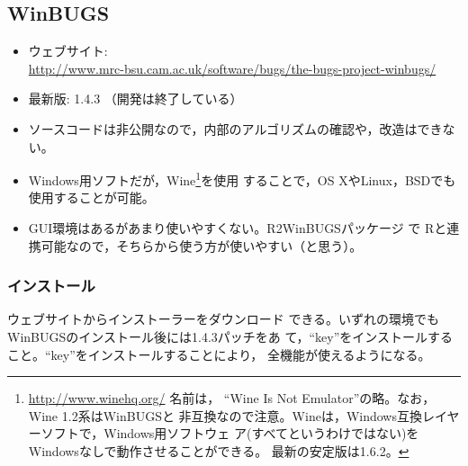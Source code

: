 \documentclass[11pt,uplatex]{jsarticle}
\begin{document}


\subsection{WinBUGS}

\begin{itemize}

\item ウェブサイト:\\
  \url{http://www.mrc-bsu.cam.ac.uk/software/bugs/the-bugs-project-winbugs/}
\item 最新版: 1.4.3 （開発は終了している）
\item ソースコードは非公開なので，内部のアルゴリズムの確認や，改造はできない。
\item Windows用ソフトだが，\textsf{Wine}\footnote{\url{http://www.winehq.org/} 名前は，
``Wine Is Not Emulator''の略。なお，\textsf{Wine} 1.2系は\textsf{WinBUGS}と
  非互換なので注意。\textsf{Wine}は，Windows互換レイヤーソフトで，Windows用ソフトウェ
  ア(すべてというわけではない)をWindowsなしで動作させることができる。
  最新の安定版は1.6.2。}を使用
  することで，OS XやLinux，BSDでも使用することが可能。
\item GUI環境はあるがあまり使いやすくない。\textsf{R2WinBUGS}パッケージ
  で \textsf{R}と連携可能なので，そちらから使う方が使いやすい（と思う）。
\end{itemize}

\subsubsection*{インストール}

ウェブサイトからインストーラーをダウンロード
できる。いずれの環境でも\textsf{WinBUGS}のインストール後には1.4.3パッチをあ
て，``key''をインストールすること。``key''をインストールすることにより，
全機能が使えるようになる。
\end{document}
